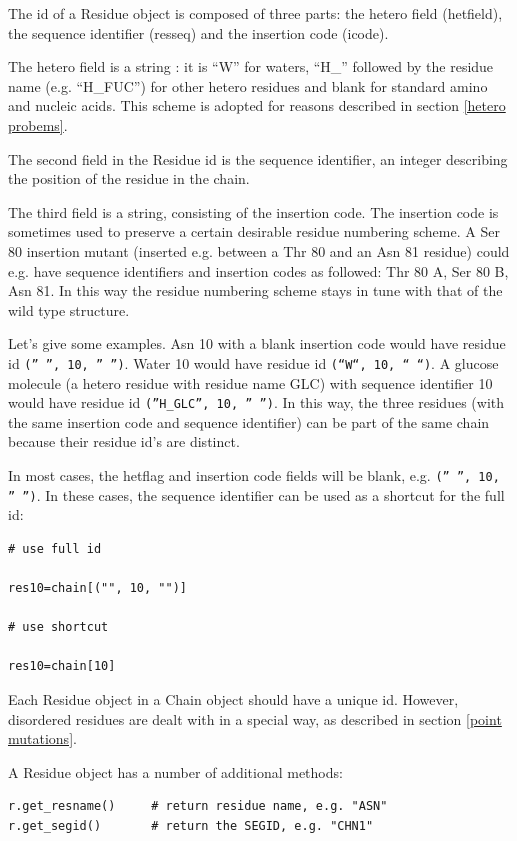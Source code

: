 \documentclass{report}
\begin{document}
The id of a Residue object is composed of three parts: the hetero field (hetfield),
the sequence identifier (resseq) and the insertion code (icode).

The hetero field is a string : it is {}``W{}'' for waters, {}``H\_{}'' followed
by the residue name (e.g. {}``H\_FUC{}'') for other hetero residues and blank
for standard amino and nucleic acids. This scheme is adopted for reasons described
in section \ref{hetero probems}.

The second field in the Residue id is the sequence identifier, an integer describing
the position of the residue in the chain.

The third field is a string, consisting of the insertion code. The insertion
code is sometimes used to preserve a certain desirable residue numbering scheme.
A Ser 80 insertion mutant (inserted e.g. between a Thr 80 and an Asn 81 residue)
could e.g. have sequence identifiers and insertion codes as followed: Thr 80
A, Ser 80 B, Asn 81. In this way the residue numbering scheme stays in tune
with that of the wild type structure.

Let's give some examples. Asn 10 with a blank insertion code would have residue
id {\tt ('' '', 10, '' '')}. Water 10 would have residue id {\tt (``W``, 10, `` ``)}.
A glucose molecule (a hetero residue with residue name GLC) with sequence identifier
10 would have residue id {\tt (''H\_GLC'', 10, '' '')}. In this way, the three
residues (with the same insertion code and sequence identifier) can be part
of the same chain because their residue id's are distinct.

In most cases, the hetflag and insertion code fields will be blank, e.g. {\tt ('' '', 10, '' '')}.
In these cases, the sequence identifier can be used as a shortcut for the full
id:

\begin{verbatim}
# use full id

res10=chain[("", 10, "")]

# use shortcut

res10=chain[10]
\end{verbatim}

Each Residue object in a Chain object should have a unique id. However, disordered
residues are dealt with in a special way, as described in section \ref{point mutations}.

A Residue object has a number of additional methods:

\begin{verbatim}
r.get_resname()		# return residue name, e.g. "ASN"
r.get_segid()		# return the SEGID, e.g. "CHN1"
\end{verbatim}
\end{document}
